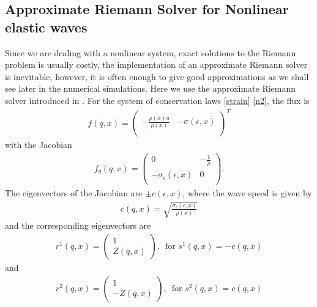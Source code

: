 \documentclass{article}
\begin{document}
\subsection{Approximate Riemann Solver for Nonlinear elastic waves}
Since we are dealing with a nonlinear system, exact solutions to the Riemann problem is usually costly, the implementation of an approximate Riemann solver is inevitable, however, it is often enough to give good approximations as we shall see later in the numerical simulations. Here we use the approximate Riemann solver introduced in \cite{leveque2003}. For the system of conservation laws \eqref{strain} \eqref{n2}, the flux is
\begin{align}
f(q,x)=\left(
                     \begin{array}{cc}
                       -\frac{\rho(x)u}{\rho(x)} & -\sigma(\epsilon,x) \\
                     \end{array}
                   \right)^T
\end{align}
with the Jacobian
\begin{align}
f_q(q,x)=\left(
                     \begin{array}{cc}
                       0  &  -\frac{1}{\rho}\\
                       -\sigma_{\epsilon}(\epsilon,x) &  0 \\
                     \end{array}
                   \right).
\end{align}
The eigenvectors of the Jacobian are $\pm c(\epsilon,x)$, where the wave speed is given by
\begin{align}
c(q,x)=\sqrt{\frac{\sigma_{\epsilon}(\epsilon,x)}{\rho(x)}}
\label{sounds}
\end{align}
and the corresponding eigenvectors are
\begin{align}
r^1(q,x)=\left(
                     \begin{array}{c}
                       1 \\
                       Z(q,x)
                     \end{array}
                   \right)  ,\,\,\, \mbox{for } s^1(q,x)=-c(q,x)
\end{align}
and
\begin{align}
r^2(q,x)=\left(
                     \begin{array}{c}
                       1 \\
                       -Z(q,x)
                     \end{array}
                   \right)  ,\,\,\, \mbox{for } s^2(q,x)=c(q,x)
\end{align}
\end{document}

